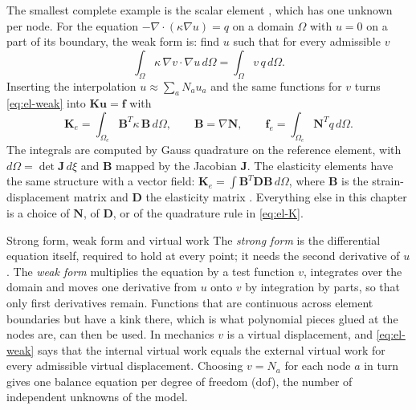 The smallest complete example is the scalar element , which has one unknown per node. For the equation $-\nabla\!\cdot(\kappa\nabla u)=q$ on a domain $\Omega$ with $u=0$ on a part of its boundary, the weak form is: find $u$ such that for every admissible $v$
\begin{equation}\label{eq:el-weak}
\int_\Omega\kappa\,\nabla v\cdot\nabla u\,d\Omega=\int_\Omega v\,q\,d\Omega .
\end{equation}
Inserting the interpolation $u\approx\sum_a N_a u_a$ and the same functions for $v$ turns \eqref{eq:el-weak} into $\bm K\bm u=\bm f$ with
\begin{equation}\label{eq:el-K}
\bm K_e=\int_{\Omega_e}\bm B^{T}\kappa\,\bm B\,d\Omega,\qquad \bm B=\nabla\bm N,\qquad
\bm f_e=\int_{\Omega_e}\bm N^{T}q\,d\Omega .
\end{equation}
The integrals are computed by Gauss quadrature on the reference element, with $d\Omega=\det\bm J\,d\xi$ and $\bm B$ mapped by the Jacobian $\bm J$. The elasticity elements have the same structure with a vector field: $\bm K_e=\int\bm B^{T}\bm D\bm B\,d\Omega$, where $\bm B$ is the strain-displacement matrix and $\bm D$ the elasticity matrix \citep{zienkiewicz2013fem,bathe2014fep}. Everything else in this chapter is a choice of $\bm N$, of $\bm D$, or of the quadrature rule in \eqref{eq:el-K}.

\begin{sidenote}{Strong form, weak form and virtual work}
The \emph{strong form} is the differential equation itself, required to hold at every point; it needs the second derivative of $u$. The \emph{weak form} multiplies the equation by a test function $v$, integrates over the domain and moves one derivative from $u$ onto $v$ by integration by parts, so that only first derivatives remain. Functions that are continuous across element boundaries but have a kink there, which is what polynomial pieces glued at the nodes are, can then be used. In mechanics $v$ is a virtual displacement, and \eqref{eq:el-weak} says that the internal virtual work equals the external virtual work for every admissible virtual displacement. Choosing $v=N_a$ for each node $a$ in turn gives one balance equation per degree of freedom (dof), the number of independent unknowns of the model.
\end{sidenote}


